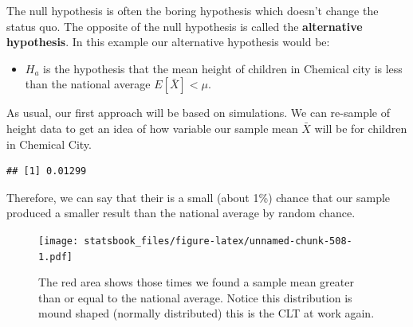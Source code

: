 \documentclass[
]{book}
\newenvironment{Shaded}{\begin{snugshade}}{\end{snugshade}}
\newcommand{\AttributeTok}[1]{\textcolor[rgb]{0.77,0.63,0.00}{#1}}
\newcommand{\ConstantTok}[1]{\textcolor[rgb]{0.00,0.00,0.00}{#1}}
\newcommand{\DecValTok}[1]{\textcolor[rgb]{0.00,0.00,0.81}{#1}}
\newcommand{\DocumentationTok}[1]{\textcolor[rgb]{0.56,0.35,0.01}{\textbf{\textit{#1}}}}
\newcommand{\FloatTok}[1]{\textcolor[rgb]{0.00,0.00,0.81}{#1}}
\newcommand{\FunctionTok}[1]{\textcolor[rgb]{0.00,0.00,0.00}{#1}}
\newcommand{\NormalTok}[1]{#1}
\newcommand{\OtherTok}[1]{\textcolor[rgb]{0.56,0.35,0.01}{#1}}
\newcommand{\SpecialCharTok}[1]{\textcolor[rgb]{0.00,0.00,0.00}{#1}}
\providecommand{\tightlist}{%
  \setlength{\itemsep}{0pt}\setlength{\parskip}{0pt}}
\theoremstyle{definition}
\theoremstyle{definition}
\theoremstyle{definition}
\theoremstyle{definition}
\theoremstyle{remark}
\begin{document}
The null hypothesis is often the boring hypothesis which doesn't change the status quo. The opposite of the null hypothesis is called the \textbf{alternative hypothesis}. In this example our alternative hypothesis would be:

\begin{itemize}
\tightlist
\item
  \(H_a\) is the hypothesis that the mean height of children in Chemical city is less than the national average \(E[\bar{X}]< \mu\).
\end{itemize}

As usual, our first approach will be based on simulations. We can re-sample of height data to get an idea of how variable our sample mean \(\bar{X}\) will be for children in Chemical City.

\begin{Shaded}
\end{Shaded}

\begin{verbatim}
## [1] 0.01299
\end{verbatim}

Therefore, we can say that their is a small (about 1\%) chance that our sample produced a smaller result than the national average by random chance.

\begin{figure}
\centering
\texttt{[image: statsbook\_files/figure-latex/unnamed-chunk-508-1.pdf]}
\caption{\label{fig:unnamed-chunk-508}The red area shows those times we found a sample mean greater than or equal to the national average. Notice this distribution is mound shaped (normally distributed) this is the CLT at work again.}
\end{figure}
\end{document}
